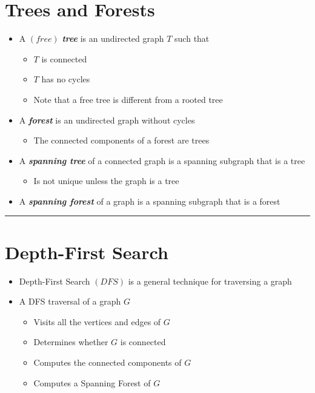 \documentclass{article}
\begin{document}
\section{Trees and Forests}
\begin{itemize}
  \item{A $(free)$ \textbf{\textit{tree}} is an undirected graph $T$ such that}
  \begin{itemize}
    \item{$T$ is connected}
    \item{$T$ has no cycles}
    \item{Note that a free tree is different from a rooted tree}
  \end{itemize}
  \item{A \textbf{\textit{forest}} is an undirected graph without cycles}
  \begin{itemize}
    \item{The connected components of a forest are trees}
  \end{itemize}
  \item{A \textbf{\textit{spanning tree}} of a connected graph is a spanning subgraph that is a tree}
  \begin{itemize}
    \item{Is not unique unless the graph is a tree}
  \end{itemize}
  \item{A \textbf{\textit{spanning forest}} of a graph is a spanning subgraph that is a forest}
\end{itemize}

\begin{center}
  \rule{0.5\textwidth}{0.4pt}
\end{center}

\section{Depth-First Search}
\begin{itemize}
  \item{Depth-First Search $(DFS)$ is a general technique for traversing a graph}
  \item{A DFS traversal of a graph $G$}
  \begin{itemize}
    \item{Visits all the vertices and edges of $G$}
    \item{Determines whether $G$ is connected}
    \item{Computes the connected components of $G$}
    \item{Computes a Spanning Forest of $G$}
  \end{itemize}
\end{itemize}
\end{document}
